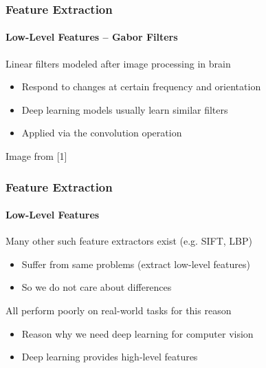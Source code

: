 \documentclass[xetex,professionalfont]{beamer}
\renewcommand\emph[1]{\textcolor{tuwcvl_cvl_blue}{#1}}
\newcommand{\eg}{\mbox{e.g.}\xspace} %
\begin{document}
\begin{frame}
  \frametitle{Feature Extraction}
  \framesubtitle{Low-Level Features -- Gabor Filters}

Linear filters modeled after image processing in brain
\begin{itemize}
    \item Respond to changes at certain frequency and orientation
    \item Deep learning models usually learn similar filters
    \item Applied via the \emph{convolution operation}
\end{itemize}

\bigskip

\begin{center}
    {\centering Image from [1]}
\end{center}

\end{frame}


\begin{frame}
\frametitle{Feature Extraction}
\framesubtitle{Low-Level Features}

Many other such feature extractors exist (\eg SIFT, LBP)
\begin{itemize}
    \item Suffer from same problems (extract low-level features)
    \item So we do not care about differences
\end{itemize}

\bigskip

All perform poorly on real-world tasks for this reason
\begin{itemize}
    \item Reason why we need deep learning for computer vision
    \item Deep learning provides high-level features
\end{itemize}

\end{frame}
\end{document}
